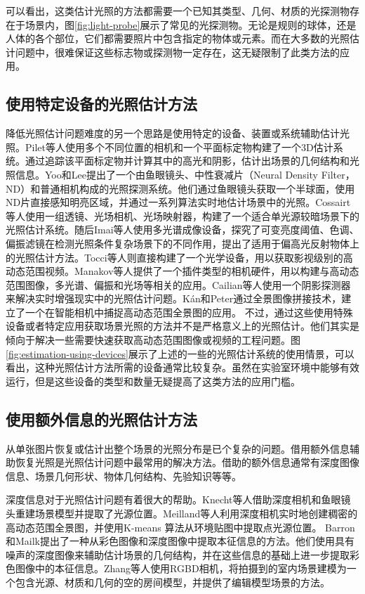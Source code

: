 可以看出，这类估计光照的方法都需要一个已知其类型、几何、材质的光探测物存在于场景内，图\ref{fig:light-probe}展示了常见的光探测物。无论是规则的球体，还是人体的各个部位，它们都需要照片中包含指定的物体或元素。而在大多数的光照估计问题中，很难保证这些标志物或探测物一定存在，这无疑限制了此类方法的应用。

\subsection{使用特定设备的光照估计方法}

降低光照估计问题难度的另一个思路是使用特定的设备、装置或系统辅助估计光照。Pilet等人\cite{pilet2006all}使用多个不同位置的相机和一个平面标定物构建了一个3D估计系统。通过追踪该平面标定物并计算其中的高光和阴影，估计出场景的几何结构和光照信息。Yoo和Lee\cite{yoo2008real}提出了一个由鱼眼镜头、中性衰减片（Neural Density Filter，ND）和普通相机构成的光照探测系统。他们通过鱼眼镜头获取一个半球面，使用ND片直接感知明亮区域，并通过一系列算法实时地估计场景中的光照。Cossairt等人\cite{cossairt2008light}使用一组透镜、光场相机、光场映射器，构建了一个适合单光源较暗场景下的光照估计系统。随后Imai等人\cite{imai2011estimation}使用多光谱成像设备，探究了可变亮度阈值、色调、偏振滤镜在检测光照条件复杂场景下的不同作用，提出了适用于偏高光反射物体上的光照估计方法。Tocci等人\cite{tocci2011versatile}则直接构建了一个光学设备，用以获取影视级别的高动态范围视频。Manakov等人\cite{manakov2013reconfigurable}提供了一个插件类型的相机硬件，用以构建与高动态范围图像，多光谱、偏振和光场等相关的应用。Cailian等人\cite{calian2013shading}使用一个阴影探测器来解决实时增强现实中的光照估计问题。K\'an和Peter\cite{kan2015interactive}通过全景图像拼接技术，建立了一个在智能相机中捕捉高动态范围全景图的应用。
不过，通过这些使用特殊设备或者特定应用获取场景光照的方法并不是严格意义上的光照估计。他们其实是倾向于解决一些需要快速获取高动态范围图像或视频的工程问题。图\ref{fig:estimation-using-devices}展示了上述的一些的光照估计系统的使用情景，可以看出，这种光照估计方法所需的设备通常比较复杂。虽然在实验室环境中能够有效运行，但是这些设备的类型和数量无疑提高了这类方法的应用门槛。

\subsection{使用额外信息的光照估计方法}
从单张图片恢复或估计出整个场景的光照分布是已个复杂的问题。借用额外信息辅助恢复光照是光照估计问题中最常用的解决方法。借助的额外信息通常有深度图像信息、场景几何形状、物体几何结构、先验知识等等。

深度信息对于光照估计问题有着很大的帮助。Knecht等人\cite{knecht2012reciprocal}借助深度相机和鱼眼镜头重建场景模型并提取了光源位置。Meilland等人\cite{meilland20133d}利用深度相机实时地创建稠密的高动态范围全景图，并使用K-means 算法从环境贴图中提取点光源位置。 Barron和Mailk\cite{barron2013intrinsic}提出了一种从彩色图像和深度图像中提取本征信息的方法。他们使用具有噪声的深度图像来辅助估计场景的几何结构，并在这些信息的基础上进一步提取彩色图像中的本征信息。Zhang等人\cite{zhang2016emptying}使用RGBD相机，将拍摄到的室内场景建模为一个包含光源、材质和几何的空的房间模型，并提供了编辑模型场景的方法。

